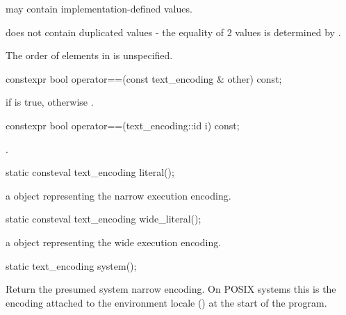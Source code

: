 \documentclass{wg21}
\begin{document}
\begin{addedblock}
\begin{itemdescr}
\pnum {} may contain implementation-defined values.

\pnum {} does not contain duplicated values - the equality of 2 values is determined by .

\begin{note}
The order of elements in  is unspecified.
\end{note}

\end{itemdescr}

\begin{itemdecl}
constexpr bool operator==(const text_encoding & other) const;
\end{itemdecl}

\begin{itemdescr}
\returns
{} if  is true,
otherwise
.
\end{itemdescr}

\begin{itemdecl}
constexpr bool operator==(text_encoding::id i) const;
\end{itemdecl}

\begin{itemdescr}
\returns {}.
\end{itemdescr}

\begin{itemdecl}
static consteval text_encoding literal();
\end{itemdecl}

\begin{itemdescr}
    \returns a  object representing the narrow execution encoding.
\end{itemdescr}

\begin{itemdecl}
static consteval text_encoding wide_literal();
\end{itemdecl}

\begin{itemdescr}
    \returns a  object representing the wide execution encoding.
\end{itemdescr}

\begin{itemdecl}
static text_encoding system();
\end{itemdecl}

\begin{itemdescr}
Return the presumed system narrow encoding.
On POSIX systems this is the encoding attached to the environment locale () at the start of the program.


\end{itemdescr}
\end{addedblock}
\end{document}
